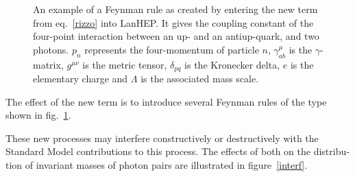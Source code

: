 \begin{english}
\begin{figure}[hbt]\begin{center}
{\footnotesize{}
}\end{center}
\caption{An example of a Feynman rule as created by entering the new term from eq.~\eqref{rizzo} into LanHEP\cite{lanhep}. It gives the coupling constant of the four-point interaction between an up- and an antiup-quark, and two photons. $p_n$ represents the four-momentum of particle $n$, $\gamma_{ab}^\mu$ is the $\gamma$-matrix, $g^{\mu\nu}$ is the metric tensor, $\delta_{pq}$ is the Kronecker delta, $e$ is the elementary charge and $\Lambda$ is the associated mass scale.\label{rule}}
\end{figure}

The effect of the new term is to introduce several Feynman rules of the type shown in fig.~\ref{rule}.

\begin{new}
These new processes may interfere constructively or destructively with the Standard Model contributions to this process. The effects of both on the distribution of invariant masses of photon pairs are illustrated in figure~\ref{interf}.


\end{new}
\end{english}
